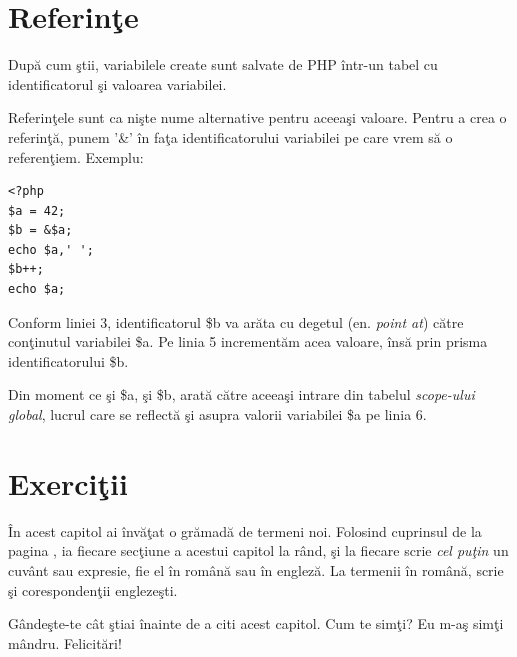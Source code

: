 \section{Referinţe}
După cum ştii, variabilele create sunt salvate de PHP într-un tabel cu identificatorul
şi valoarea variabilei.

Referinţele sunt ca nişte nume alternative pentru aceeaşi valoare. Pentru a crea o referinţă,
punem '\&' în faţa identificatorului variabilei pe care vrem să o referenţiem. Exemplu:

\begin{lstlisting}
<?php
$a = 42;
$b = &$a;
echo $a,' ';
$b++;
echo $a;
\end{lstlisting}
Conform liniei 3, identificatorul \$b va {\glqq}arăta cu degetul{\grqq} (en. \textsl{point at})
către conţinutul variabilei \$a. Pe linia 5 incrementăm acea valoare, însă prin prisma
identificatorului \$b.

Din moment ce şi \$a, şi \$b, arată către aceeaşi intrare din tabelul
\textit{\textit{scope}-ului global}, lucrul care
se reflectă şi asupra valorii variabilei \$a pe linia 6.

\section{Exerciţii}

\begin{Exercise}[title={Terminologie},difficulty=1]
În acest capitol ai învăţat o grămadă de termeni noi.
Folosind cuprinsul de la pagina \pageref{cuprins},
ia fiecare secţiune a acestui capitol la rând, şi la fiecare
scrie \textit{cel puţin} un cuvânt sau expresie,
fie el în română sau în engleză. La termenii în română,
scrie şi corespondenţii englezeşti.

Gândeşte-te cât ştiai înainte de a citi acest
capitol. Cum te simţi? Eu m-aş simţi mândru.
Felicitări!
\end{Exercise}


